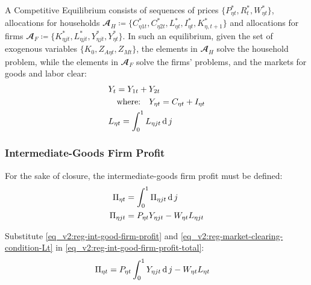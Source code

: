 \documentclass[../thesis.tex]{subfiles}
\begin{document}
	A Competitive Equilibrium consists of sequences of prices $\{P_{\eta t}^{\ast}, R_t^{\ast}, W_{\eta t}^{\ast}\}$, allocations for households $\mathbfscr{A}_H \coloneq \{C_{\eta 1 t}^{\ast}, C_{\eta 2 t}^{\ast}, L_{\eta t}^{\ast}, I_{\eta t}^{\ast}, K_{\eta, t+1}^{\ast}\}$ and allocations  for firms $\mathbfscr{A}_F \coloneq \{K_{\eta jt}^{\ast}, L_{\eta jt}^{\ast}, Y_{\eta jt}^{\ast}, Y_{\eta t}^{\ast}\}$. In such an equilibrium, given the set of exogenous variables $\{K_0, Z_{A\eta t}, Z_{Mt}\}$, the elements in $\mathbfscr{A}_H$ solve the household problem, while the elements in $\mathbfscr{A}_F$ solve the firms' problems, and the markets for goods and labor clear: %
	\begin{align}
		& Y_{t} = Y_{1 t} + Y_{2 t} \label{eq_v2:reg-market-clearing-condition-Yt} \\
		& \quad \text{where:} \quad Y_{\eta t} = C_{\eta t} + I_{\eta t} \label{eq_v2:reg-regional-demand} \\
		& L_{\eta t} = \int_{0}^{1} L_{\eta jt} \operatorname{d} j \label{eq_v2:reg-market-clearing-condition-Lt} 
	\end{align}
	

\subsubsection*{Intermediate-Goods Firm Profit}

For the sake of closure, the intermediate-goods firm profit must be defined:
\begin{align}
	\Pi_{\eta t} &= \int_{0}^{1} \Pi_{\eta jt} \operatorname{d} j \label{eq_v2:reg-int-good-firm-profit-total} \\
	\Pi_{\eta jt} &= P_{\eta t} Y_{\eta jt} - W_{\eta t} L_{\eta jt} \label{eq_v2:reg-int-good-firm-profit}
\end{align}

Substitute \ref{eq_v2:reg-int-good-firm-profit} and \ref{eq_v2:reg-market-clearing-condition-Lt} in \ref{eq_v2:reg-int-good-firm-profit-total}:
\begin{align}
	\Pi_{\eta t} &= P_{\eta t} \int_{0}^{1} Y_{\eta jt} \operatorname{d} j - W_{\eta t} L_{\eta t} \label{eq_v2:reg-int-good-firm-profit-total-2}
\end{align}
\end{document}
